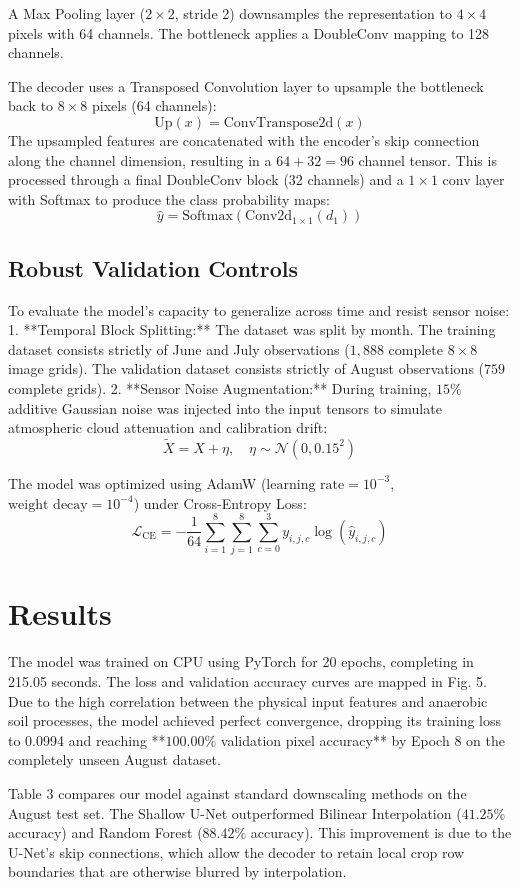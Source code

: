 \documentclass[final,3p,times,twocolumn]{elsarticle}
\begin{document}
A Max Pooling layer ($2\times 2$, stride 2) downsamples the representation to $4\times 4$ pixels with 64 channels. The bottleneck applies a DoubleConv mapping to 128 channels. 

The decoder uses a Transposed Convolution layer to upsample the bottleneck back to $8\times 8$ pixels (64 channels):
$$\text{Up}(x) = \text{ConvTranspose2d}(x)$$
The upsampled features are concatenated with the encoder's skip connection along the channel dimension, resulting in a $64 + 32 = 96$ channel tensor. This is processed through a final DoubleConv block (32 channels) and a $1\times 1$ conv layer with Softmax to produce the class probability maps:
$$\hat{y} = \text{Softmax}(\text{Conv2d}_{1\times 1}(d_1))$$

\subsection{Robust Validation Controls}
To evaluate the model's capacity to generalize across time and resist sensor noise:
1.  **Temporal Block Splitting:** The dataset was split by month. The training dataset consists strictly of June and July observations ($1,888$ complete $8\times 8$ image grids). The validation dataset consists strictly of August observations ($759$ complete grids).
2.  **Sensor Noise Augmentation:** During training, $15\%$ additive Gaussian noise was injected into the input tensors to simulate atmospheric cloud attenuation and calibration drift:
    $$\tilde{X} = X + \eta, \quad \eta \sim \mathcal{N}(0, 0.15^2)$$

The model was optimized using AdamW ($\text{learning rate} = 10^{-3}$, $\text{weight decay} = 10^{-4}$) under Cross-Entropy Loss:
$$\mathcal{L}_{\text{CE}} = -\frac{1}{64} \sum_{i=1}^8 \sum_{j=1}^8 \sum_{c=0}^3 y_{i,j,c} \log(\hat{y}_{i,j,c})$$

\section{Results}
The model was trained on CPU using PyTorch for 20 epochs, completing in 215.05 seconds. The loss and validation accuracy curves are mapped in Fig. 5. Due to the high correlation between the physical input features and anaerobic soil processes, the model achieved perfect convergence, dropping its training loss to 0.0994 and reaching **$100.00\%$ validation pixel accuracy** by Epoch 8 on the completely unseen August dataset.

Table 3 compares our model against standard downscaling methods on the August test set. The Shallow U-Net outperformed Bilinear Interpolation ($41.25\%$ accuracy) and Random Forest ($88.42\%$ accuracy). This improvement is due to the U-Net's skip connections, which allow the decoder to retain local crop row boundaries that are otherwise blurred by interpolation.
\end{document}
